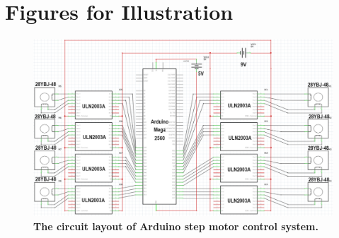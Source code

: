 \chapter{Figures for Illustration}
\label{append:figures}

\begin{landscape}
    \begin{figure}[H] %
        \centering 
        \captionsetup{labelsep=colon}
        \includegraphics[width=1.5\textwidth]{Image/Design/arduino_circuit_layout.png} 
        \caption[]
        {\centering \textbf{The circuit layout of Arduino step motor control system.}}
        \label{fig:motor_circuit_layout}
    \end{figure}
\end{landscape}
\newpage
